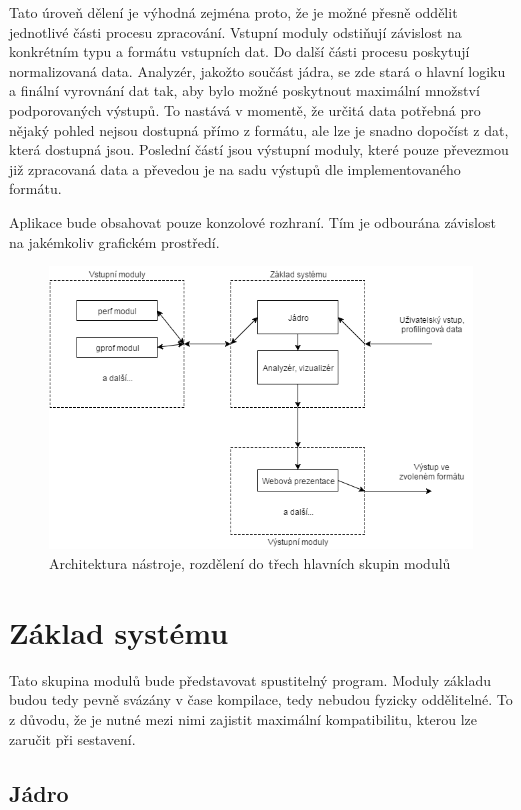 \documentclass[czech,BP]{thesiskiv}
\begin{document}
Tato úroveň dělení je výhodná zejména proto, že je možné přesně oddělit jednotlivé části procesu zpracování. Vstupní moduly odstiňují závislost na konkrétním typu a formátu vstupních dat. Do další části procesu poskytují normalizovaná data. Analyzér, jakožto součást jádra, se zde stará o hlavní logiku a finální vyrovnání dat tak, aby bylo možné poskytnout maximální množství podporovaných výstupů. To nastává v momentě, že určitá data potřebná pro nějaký pohled nejsou dostupná přímo z formátu, ale lze je snadno dopočíst z dat, která dostupná jsou. Poslední částí jsou výstupní moduly, které pouze převezmou již zpracovaná data a převedou je na sadu výstupů dle implementovaného formátu.

Aplikace bude obsahovat pouze konzolové rozhraní. Tím je odbourána závislost na jakémkoliv grafickém prostředí.

\begin{figure}[h]
    \centering
    \includegraphics[interpolate,width=1.0\textwidth]{img/system_diagr.png}
    \caption{Architektura nástroje, rozdělení do třech hlavních skupin modulů}
    \label{obr:systemmodules}
\end{figure}

\section{Základ systému}

Tato skupina modulů bude představovat spustitelný program. Moduly základu budou tedy pevně svázány v čase kompilace, tedy nebudou fyzicky oddělitelné. To z důvodu, že je nutné mezi nimi zajistit maximální kompatibilitu, kterou lze zaručit při sestavení.

\subsection{Jádro}
\end{document}
